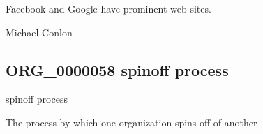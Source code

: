\documentclass[letterpaper,10pt,english]{sphinxmanual}
\begin{document}
\begin{sphinxShadowBox}

\sphinxAtStartPar
{}
\end{sphinxShadowBox}

\begin{sphinxShadowBox}

\sphinxAtStartPar
Facebook and Google have prominent web sites.
\end{sphinxShadowBox}

\begin{sphinxShadowBox}

\sphinxAtStartPar
{}
\end{sphinxShadowBox}

\begin{sphinxShadowBox}

\sphinxAtStartPar
Michael Conlon 
\end{sphinxShadowBox}
\begin{quote}

\ignorespaces \end{quote}


\subsection{ORG\_0000058 \sphinxhyphen{} spin\sphinxhyphen{}off process}
\label{\detokenize{doc-ORG_0000058:org-0000058-spin-off-process}}\label{\detokenize{doc-ORG_0000058:index-0}}\label{\detokenize{doc-ORG_0000058::doc}}
\begin{sphinxShadowBox}

\sphinxAtStartPar
spin\sphinxhyphen{}off process
\end{sphinxShadowBox}

\begin{sphinxShadowBox}

\sphinxAtStartPar
The process by which one organization spins off of another
\end{sphinxShadowBox}
\end{document}
